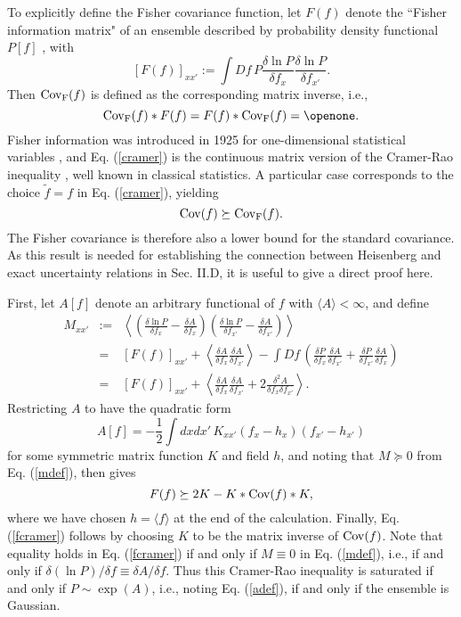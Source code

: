 \documentclass[a4paper,preprint, showpacs, aps, draft]{revtex4}
\begin{document}
{To explicitly define the Fisher covariance function, let $F(f)$
denote the ``Fisher information matrix" of an ensemble described by
probability density functional $P[f]$ \cite{cover, cramer}, with
\begin{equation} \label{fishmat}
\left[ F(f)\right]_{x x'} := \int D\! f\, P \frac{\delta\ln P}{\delta f_x} 
\frac{\delta\ln P}{\delta f_{x'}}.
\end{equation}
Then ${\rm Cov_F}(f)$ is defined as the corresponding matrix inverse,
i.e.,
\begin{equation}  \label{finv}
{\rm Cov_F}(f)\ast F(f) = F(f) \ast {\rm Cov_F}(f) = \openone .
\end{equation}
Fisher information was introduced in 1925 for one-dimensional
statistical variables \cite{fish}, and Eq. (\ref{cramer}) 
is the continuous matrix version of the 
Cramer-Rao inequality \cite{cramer}, well known in classical statistics.
A particular case corresponds to the choice
$\tilde{f}=f$ in Eq. (\ref{cramer}), yielding
\begin{equation} \label{fcramer}
{\rm Cov}(f)\succeq{\rm Cov_F}(f) . 
\end{equation}
The Fisher covariance is therefore also a lower bound for the standard
covariance.  As this result is needed for establishing the connection
between Heisenberg and exact uncertainty relations in Sec. II.D, it
is useful to give a direct proof here.

First, let $A[f]$ denote an arbitrary functional of $f$ with $\langle
A\rangle < \infty$, and define
\begin{eqnarray} \label{mdef}
M_{xx'} & := &\left\langle\left(\frac{\delta\ln P}{\delta f_x} - \frac{\delta
A}{\delta f_x}\right) \left(\frac{\delta\ln P}{\delta f_{x'}}
-\frac{\delta A}{\delta f_{x'}}\right)\right\rangle\\ 
& = & \left[F(f)\right]_{xx'} +\left\langle\frac{\delta A}{\delta f_{x}}
\frac{\delta A}{\delta f_{x'}}\right\rangle - \int D\! f\,\left( \frac{\delta
P}{\delta f_x}\frac{\delta A}{\delta f_{x'}} + \frac{\delta P}{\delta
f_{x'}}\frac{\delta A}{\delta f_{x}}\right) \nonumber\\
& = & \left[F(f)\right]_{xx'} + \left\langle\frac{\delta A}{\delta
f_{x}}\frac{\delta A}{\delta f_{x'}} + 2\frac{\delta^2 A}{\delta f_x
\delta f_{x'}} \right\rangle .\nonumber
\end{eqnarray}
Restricting $A$ to have the quadratic form
\begin{equation} \label{adef}
A[f] = -\frac{1}{2} \int dxdx'\, K_{xx'}(f_x-h_x)(f_{x'}-h_{x'})
\end{equation}
for some symmetric matrix function $K$ and field $h$, and
noting that $M\succeq 0$ from Eq. (\ref{mdef}), then gives
\[
F(f) \succeq 2K - K\ast{\rm Cov}(f)\ast K , \]
where we have chosen $h=\langle f\rangle$ at the end of the calculation.  
Finally, Eq.
(\ref{fcramer}) follows by choosing $K$ to be the matrix inverse of
${\rm Cov}(f)$. 
Note that equality holds in Eq. (\ref{fcramer}) if and only
if $M\equiv 0$ in Eq. (\ref{mdef}), i.e., if and only if $\delta (\ln
P)/\delta f \equiv \delta A/\delta f$.  Thus this Cramer-Rao 
inequality is saturated
if and only if $P\sim\exp(A)$, i.e., noting Eq. (\ref{adef}), if and
only if the ensemble is Gaussian.

}
\end{document}
